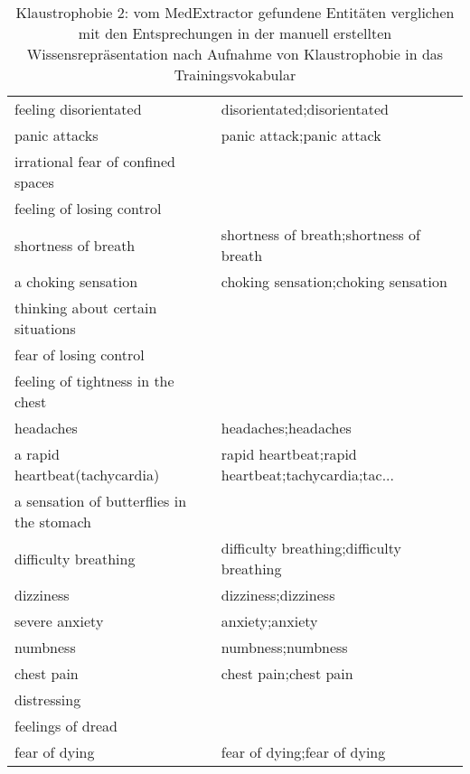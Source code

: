 \begin{table}[H]
\begin{center}
\begin{tabular}{ll}
                       feeling disorientated &                        disorientated;disorientated \\
                               panic attacks &                          panic attack;panic attack \\
          irrational fear of confined spaces &                                                    \\
                   feeling of losing control &                                                    \\
                         shortness of breath &            shortness of breath;shortness of breath \\
                         a choking sensation &                choking sensation;choking sensation \\
           thinking about certain situations &                                                    \\
                      fear of losing control &                                                    \\
           feeling of tightness in the chest &                                                    \\
                                   headaches &                                headaches;headaches \\
              a rapid heartbeat(tachycardia) & rapid heartbeat;rapid heartbeat;tachycardia;tac... \\
   a sensation of butterflies in the stomach &                                                    \\
                        difficulty breathing &          difficulty breathing;difficulty breathing \\
                                   dizziness &                                dizziness;dizziness \\
                              severe anxiety &                                    anxiety;anxiety \\
                                    numbness &                                  numbness;numbness \\
                                  chest pain &                              chest pain;chest pain \\
                                 distressing &                                                    \\
                           feelings of dread &                                                    \\
                               fear of dying &                        fear of dying;fear of dying \\
\bottomrule
\end{tabular}
\caption{Klaustrophobie 2: vom MedExtractor gefundene Entitäten verglichen mit den Entsprechungen in der manuell erstellten Wissensrepräsentation nach Aufnahme von Klaustrophobie in das Trainingsvokabular}
\label{tab:claustrophobia_medextractor_manuell}
\end{center}
\end{table}

